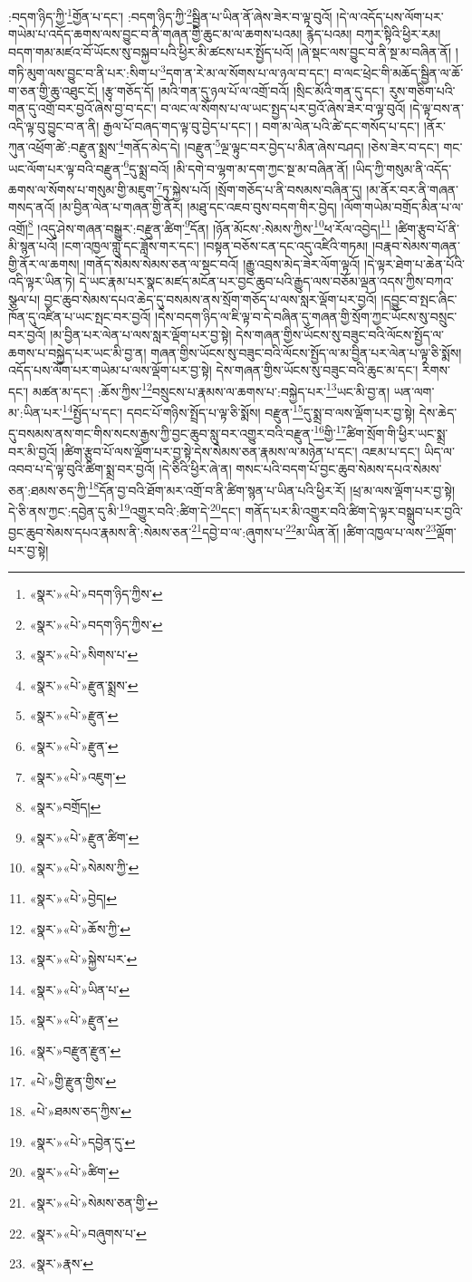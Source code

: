 :བདག་ཉིད་ཀྱི་\footnote{«སྣར་»«པེ་»བདག་ཉིད་ཀྱིས་}གྱོན་པ་དང་། :བདག་ཉིད་ཀྱི་\footnote{«སྣར་»«པེ་»བདག་ཉིད་ཀྱིས་}སྦྱིན་པ་ཡིན་ནོ་ཞེས་ཟེར་བ་ལྟ་བུའོ། །དེ་ལ་འདོད་པས་ལོག་པར་གཡེམ་པ་འདོད་ཆགས་ལས་བྱུང་བ་ནི་གཞན་གྱི་ཆུང་མ་ལ་ཆགས་པའམ། རྙེད་པའམ། བཀུར་སྟིའི་ཕྱིར་རམ། བདག་གམ་མཛའ་བོ་ཡོངས་སུ་བསྐྱབ་པའི་ཕྱིར་མི་ཚངས་པར་སྤྱོད་པའོ། །ཞེ་སྡང་ལས་བྱུང་བ་ནི་སྔ་མ་བཞིན་ནོ། །གཏི་མུག་ལས་བྱུང་བ་ནི་པར་:སིག་པ་\footnote{«སྣར་»«པེ་»སིགས་པ་}དག་ན་རེ་མ་ལ་སོགས་པ་ལ་ཉལ་བ་དང་། བ་ལང་ཕྲེང་གི་མཆོད་སྦྱིན་ལ་ཆོ་ག་ཅན་གྱི་ཆུ་འཐུང་ངོ། །རྩྭ་གཅོད་དོ། །མའི་གན་དུ་ཉལ་པོ་ལ་འགྲོ་བའོ། །སྲིང་མོའི་གན་དུ་དང་། རུས་གཅིག་པའི་གན་དུ་འགྲོ་བར་བྱའོ་ཞེས་བྱ་བ་དང་། བ་ལང་ལ་སོགས་པ་ལ་ཡང་སྤྱད་པར་བྱའོ་ཞེས་ཟེར་བ་ལྟ་བུའོ། །དེ་ལྟ་བས་ན་འདི་ལྟ་བུ་བྱུང་བ་ན་ནི། རྒྱལ་པོ་བཞད་གད་ལྟ་བུ་བྱེད་པ་དང་། །
བག་མ་ལེན་པའི་ཚེ་དང་གསོད་པ་དང་། །ནོར་ཀུན་འཕྲོག་ཚེ་:བརྫུན་སྨྲས་\footnote{«སྣར་»«པེ་»རྫུན་སྨྲས་}གནོད་མེད་དེ། །བརྫུན་\footnote{«སྣར་»«པེ་»རྫུན་}ལྔ་ལྟུང་བར་བྱེད་པ་མིན་ཞེས་བཤད། །ཅེས་ཟེར་བ་དང་། གང་ཡང་ལོག་པར་ལྟ་བའི་བརྫུན་\footnote{«སྣར་»«པེ་»རྫུན་}དུ་སྨྲ་བའོ། །མི་དགེ་བ་ལྷག་མ་དག་ཀྱང་སྔ་མ་བཞིན་ནོ། །ཡིད་ཀྱི་གསུམ་ནི་འདོད་ཆགས་ལ་སོགས་པ་གསུམ་གྱི་མཇུག་\footnote{«སྣར་»«པེ་»འཇུག་}ཏུ་སྐྱེས་པའོ། །སྲོག་གཅོད་པ་ནི་བསམས་བཞིན་དུ། །མ་ནོར་བར་ནི་གཞན་གསད་ནའོ། །མ་བྱིན་ལེན་པ་གཞན་གྱི་ནོར། །མཐུ་དང་འཇབ་བུས་བདག་གིར་བྱེད། །ལོག་གཡེམ་བགྲོད་མིན་པ་ལ་འགྲོ།\footnote{«སྣར་»བགྲོད།} །འདུ་ཤེས་གཞན་བསྒྱུར་:བརྫུན་ཚིག་\footnote{«སྣར་»«པེ་»རྫུན་ཚིག་}དོན། །ཉོན་མོངས་:སེམས་ཀྱིས་\footnote{«སྣར་»«པེ་»སེམས་ཀྱི་}ཕ་རོལ་འབྱེད།\footnote{«སྣར་»«པེ་»བྱེད།} །ཚིག་རྩུབ་པོ་ནི་མི་སྙན་པའོ། །ངག་འཁྱལ་གླུ་དང་ཟློས་གར་དང་། །བསྟན་བཅོས་ངན་དང་འདུ་འཛིའི་གཏམ། །བརྣབ་སེམས་གཞན་གྱི་ནོར་ལ་ཆགས། །གནོད་སེམས་སེམས་ཅན་ལ་སྡང་བའོ། །རྒྱུ་འབྲས་མེད་ཟེར་ལོག་ལྟའོ། །དེ་ལྟར་ཐེག་པ་ཆེན་པོའི་འདི་ལྟར་ཡིན་ཏེ། དེ་ཡང་རྣམ་པར་སྣང་མཛད་མངོན་པར་བྱང་ཆུབ་པའི་རྒྱུད་ལས་བཅོམ་ལྡན་འདས་ཀྱིས་བཀའ་སྩལ་པ། བྱང་ཆུབ་སེམས་དཔའ་ཆེད་དུ་བསམས་ནས་སྲོག་གཅོད་པ་ལས་སླར་ལྡོག་པར་བྱའོ། །དབྱུང་བ་སྤང་ཞིང་ཁོན་དུ་འཛིན་པ་ཡང་སྤང་བར་བྱའོ། །དེས་བདག་ཉིད་ལ་ཇི་ལྟ་བ་དེ་བཞིན་དུ་གཞན་གྱི་སྲོག་ཀྱང་ཡོངས་སུ་བསྲུང་བར་བྱའོ། །མ་བྱིན་པར་ལེན་པ་ལས་སླར་ལྡོག་པར་བྱ་སྟེ། དེས་གཞན་གྱིས་ཡོངས་སུ་བཟུང་བའི་ལོངས་སྤྱོད་ལ་ཆགས་པ་བསྐྱེད་པར་ཡང་མི་བྱ་ན། གཞན་གྱིས་ཡོངས་སུ་བཟུང་བའི་ལོངས་སྤྱོད་ལ་མ་བྱིན་པར་ལེན་པ་ལྟ་ཅི་སྨོས། འདོད་པས་ལོག་པར་གཡེམ་པ་ལས་ལྡོག་པར་བྱ་སྟེ། དེས་གཞན་གྱིས་ཡོངས་སུ་བཟུང་བའི་ཆུང་མ་དང་། རིགས་དང་། མཚན་མ་དང་། :ཆོས་ཀྱིས་\footnote{«སྣར་»«པེ་»ཆོས་ཀྱི་}བསྲུངས་པ་རྣམས་ལ་ཆགས་པ་:བསྐྱེད་པར་\footnote{«སྣར་»«པེ་»སྐྱེས་པར་}ཡང་མི་བྱ་ན། ཡན་ལག་མ་:ཡིན་པར་\footnote{«སྣར་»«པེ་»ཡིན་པ་}སྤྱོད་པ་དང་། དབང་པོ་གཉིས་སྤྲོད་པ་ལྟ་ཅི་སྨོས། བརྫུན་\footnote{«སྣར་»«པེ་»རྫུན་}དུ་སྨྲ་བ་ལས་ལྡོག་པར་བྱ་སྟེ། དེས་ཆེད་དུ་བསམས་ནས་གང་གིས་སངས་རྒྱས་ཀྱི་བྱང་ཆུབ་སླུ་བར་འགྱུར་བའི་བརྫུན་\footnote{«སྣར་»བརྫུན་རྫུན་}གྱི་\footnote{«པེ་»གྱི་རྫུན་གྱིས་}ཚིག་སྲོག་གི་ཕྱིར་ཡང་སྨྲ་བར་མི་བྱའོ། །ཚིག་རྩུབ་པོ་ལས་ལྡོག་པར་བྱ་སྟེ་དེས་སེམས་ཅན་རྣམས་ལ་མཉེན་པ་དང་། འཇམ་པ་དང་། ཡིད་ལ་འབབ་པ་དེ་ལྟ་བུའི་ཚིག་སྨྲ་བར་བྱའོ། །དེ་ཅིའི་ཕྱིར་ཞེ་ན། གསང་པའི་བདག་པོ་བྱང་ཆུབ་སེམས་དཔའ་སེམས་ཅན་:ཐམས་ཅད་ཀྱི་\footnote{«པེ་»ཐམས་ཅད་ཀྱིས་}དོན་བྱ་བའི་ཐོག་མར་འགྲོ་བ་ནི་ཚིག་སྙན་པ་ཡིན་པའི་ཕྱིར་རོ། །ཕྲ་མ་ལས་ལྡོག་པར་བྱ་སྟེ། དེ་ཅི་ནས་ཀྱང་:དབྱེན་དུ་མི་\footnote{«སྣར་»«པེ་»དབྱེན་དུ་}འགྱུར་བའི་:ཚིག་དེ་\footnote{«སྣར་»«པེ་»ཚིག་}དང་། གནོད་པར་མི་འགྱུར་བའི་ཚིག་དེ་ལྟར་བསྒྲུབ་པར་བྱའི་བྱང་ཆུབ་སེམས་དཔའ་རྣམས་ནི་:སེམས་ཅན་\footnote{«སྣར་»«པེ་»སེམས་ཅན་གྱི་}དབྱེ་བ་ལ་:ཞུགས་པ་\footnote{«སྣར་»«པེ་»བཞུགས་པ་}མ་ཡིན་ནོ། །ཚིག་འཁྱལ་པ་ལས་\footnote{«སྣར་»རྣས་}ལྡོག་པར་བྱ་སྟེ། 